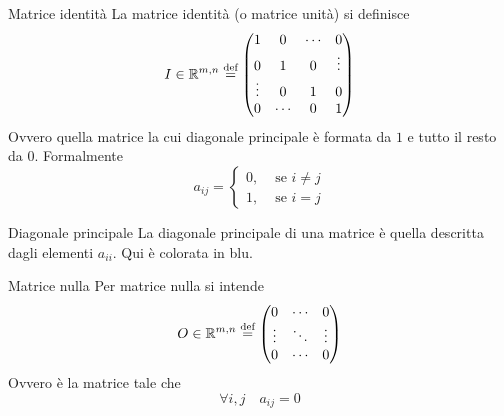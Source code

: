 \begin{Def}{Matrice identità}
  La matrice identità (o matrice unità) si definisce
  \begin{equation*}
    I\in\mathbb{R}^{m,n}\overset{\text{def}}{=}
    \begin{pmatrix}
      1 & 0 & \cdots & 0\\
      0 & 1 & 0 & \vdots\\
      \vdots & 0 & 1 & 0\\
      0 & \cdots & 0 & 1
    \end{pmatrix}
  \end{equation*}
  Ovvero quella matrice la cui diagonale principale è formata da $1$ e tutto il resto da
  $0$. Formalmente
  \begin{equation*}
    a_{ij} =
    \begin{cases}
      0, &\text{ se }i\neq j\\
      1, &\text{ se }i=j
    \end{cases}
  \end{equation*}
\end{Def}

\begin{Def}{Diagonale principale}
  La diagonale principale di una matrice è quella descritta dagli elementi $a_{ii}$. Qui
  è colorata in blu.
  \begin{center}
  \end{center}
\end{Def}

\begin{Def}{Matrice nulla}
  Per matrice nulla si intende
  \begin{equation*}
    O\in\mathbb{R}^{m,n}\overset{\text{def}}{=}
    \begin{pmatrix}
      0&\cdots&0\\
      \vdots & \ddots & \vdots\\
      0 & \cdots & 0
    \end{pmatrix}
  \end{equation*}
  Ovvero è la matrice tale che
  \begin{equation*}
    \forall i,j \quad a_{ij}=0
  \end{equation*}
\end{Def}

